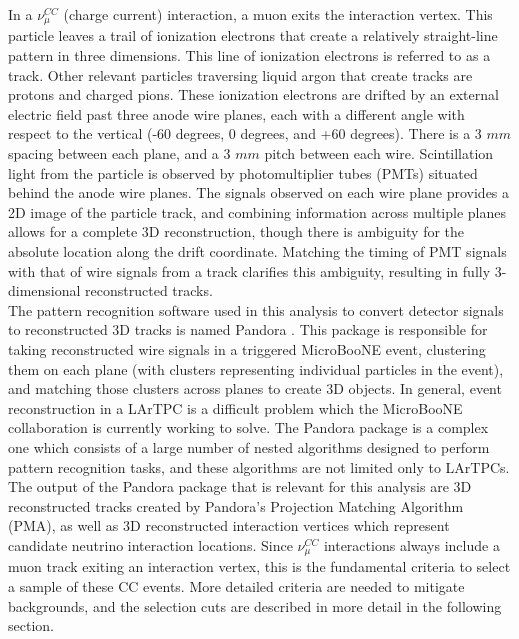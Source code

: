 In a $\nu_\mu^{CC}$ (charge current) interaction, a muon exits the interaction vertex. This particle leaves a trail of ionization electrons that create a relatively straight-line pattern in three dimensions. This line of ionization electrons is referred to as a track. Other relevant particles traversing liquid argon that create tracks are protons and charged pions. These ionization electrons are drifted by an external electric field past three anode wire planes, each with a different angle with respect to the vertical (-60 degrees, 0 degrees, and +60 degrees). There is a 3 $mm$ spacing between each plane, and a 3 $mm$ pitch between each wire. Scintillation light from the particle is observed by photomultiplier tubes (PMTs) situated behind the anode wire planes. The signals observed on each wire plane provides a 2D image of the particle track, and combining information across multiple planes allows for a complete 3D reconstruction, though there is ambiguity for the absolute location along the drift coordinate. Matching the timing of PMT signals with that of wire signals from a track clarifies this ambiguity, resulting in fully 3-dimensional reconstructed tracks.\\

The pattern recognition software used in this analysis to convert detector signals to reconstructed 3D tracks is named Pandora \cite{pandora_paper}. This package is responsible for taking reconstructed wire signals in a triggered MicroBooNE event, clustering them on each plane (with clusters representing individual particles in the event), and matching those clusters across planes to create 3D objects. In general, event reconstruction in a LArTPC is a difficult problem which the MicroBooNE collaboration is currently working to solve. The Pandora package is a complex one which consists of a large number of nested algorithms designed to perform pattern recognition tasks, and these algorithms are not limited only to LArTPCs.\\

The output of the Pandora package that is relevant for this analysis are 3D reconstructed tracks created by Pandora's Projection Matching Algorithm (PMA), as well as 3D reconstructed interaction vertices which represent candidate neutrino interaction locations. Since $\nu_\mu^{CC}$ interactions always include a muon track exiting an interaction vertex, this is the fundamental criteria to select a sample of these CC events. More detailed criteria are needed to mitigate backgrounds, and the selection cuts are described in more detail in the following section.

